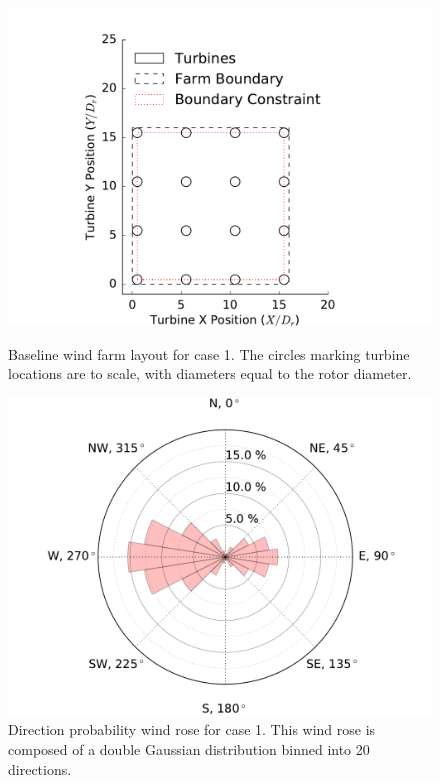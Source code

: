 \documentclass[a4paper]{jpconf}
\begin{document}
\begin{figure}[h!]
\centering
\begin{minipage}[t]{18pc}
\centering
\includegraphics[width=1.\textwidth, trim={3cm, 0cm, 3cm, 0cm}, clip]{final_images/grid_farm_16Turbines_5DSpacing_start.pdf}
\caption{Baseline wind farm layout for case 1. The circles marking turbine locations are to scale, with diameters equal to the rotor diameter.}
\label{fig:grid_case}
\end{minipage}\hspace{1pc}%
\begin{minipage}[t]{18pc}
\centering
\includegraphics[width=\textwidth, trim={1.5cm 0cm 1.5cm 0cm}, clip]{final_images/directional_windrose.pdf}
\caption{Direction probability wind rose for case 1. This wind rose is composed of a double Gaussian distribution binned into 20 directions.}
\label{fig:directional}
\end{minipage} 
\end{figure}
%
\end{document}
